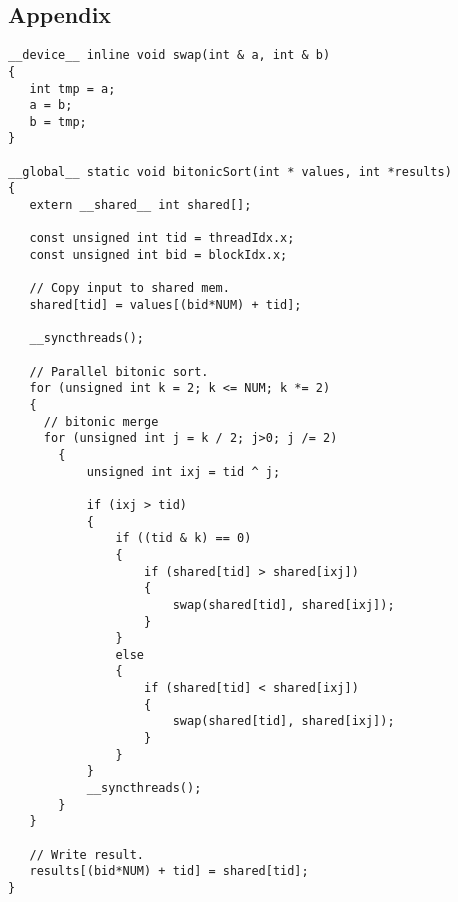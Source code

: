 






 





\subsection{Appendix}
\begin{codesize}
\begin{verbatim}
__device__ inline void swap(int & a, int & b)
{
   int tmp = a;
   a = b;
   b = tmp;
}

__global__ static void bitonicSort(int * values, int *results)
{
   extern __shared__ int shared[];

   const unsigned int tid = threadIdx.x;
   const unsigned int bid = blockIdx.x;

   // Copy input to shared mem.
   shared[tid] = values[(bid*NUM) + tid];

   __syncthreads();

   // Parallel bitonic sort.
   for (unsigned int k = 2; k <= NUM; k *= 2)
   { 
     // bitonic merge
     for (unsigned int j = k / 2; j>0; j /= 2)
       {
           unsigned int ixj = tid ^ j;

           if (ixj > tid)
           {
               if ((tid & k) == 0)
               {
                   if (shared[tid] > shared[ixj])
                   {
                       swap(shared[tid], shared[ixj]);
                   }
               }
               else
               {
                   if (shared[tid] < shared[ixj])
                   {
                       swap(shared[tid], shared[ixj]);
                   }
               }
           }
           __syncthreads();
       }
   }

   // Write result.
   results[(bid*NUM) + tid] = shared[tid];
}
\end{verbatim}
\end{codesize}





